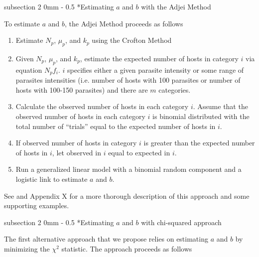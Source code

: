 \documentclass[12pt, a4paper]{article}
\makeatletter
\renewcommand{\subsection}{\@startsection
{subsection}%
{2}%
{0mm}%
{-\baselineskip}%
{0.5\baselineskip}%
{\normalfont\bf}} %
\makeatother
\begin{document}
\subsection*{Estimating $a$ and $b$ with the Adjei Method}

To estimate $a$ and $b$, the Adjei Method proceeds as follows \citep{Adjei1986}

\singlespacing
\begin{enumerate}
    \item Estimate $N_p$, $\mu_p$, and $k_p$ using the Crofton Method
    \item Given $N_p$, $\mu_p$, and $k_p$, estimate the expected number of hosts in category $i$ via equation $N_p f_i$.  $i$ specifies either a given parasite intensity or some range of parasites intensities (i.e. number of hosts with 100 parasites or number of hosts with 100-150 parasites) and there are $m$ categories.
    \item Calculate the observed number of hosts in each category $i$.  Assume that the observed number of hosts in each category $i$ is binomial distributed with the total number of ``trials'' equal to the expected number of hosts in $i$.
    \item If observed number of hosts in category $i$ is greater than the expected number of hosts in $i$, let observed in $i$ equal to expected in $i$.
    \item Run a generalized linear model with a binomial random component and a logistic link to estimate $a$ and $b$.
\end{enumerate}

\doublespacing
See \cite{Adjei1986} and Appendix X for a more thorough description of this approach and some supporting examples.

\subsection*{Estimating $a$ and $b$ with chi-squared approach}

The first alternative approach that we propose relies on estimating $a$ and $b$ by minimizing the $\chi^2$ statistic.  The approach proceeds as follows
\end{document}

